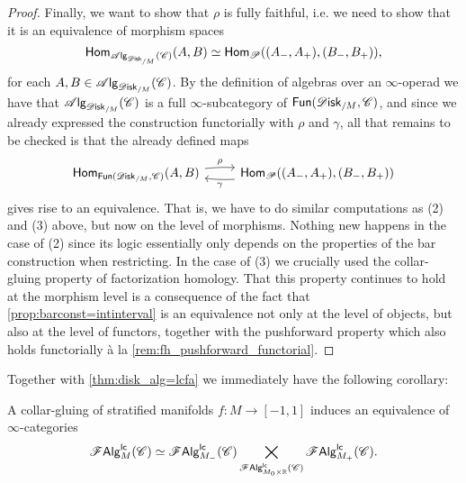 \documentclass[../text]{subfiles}
\begin{document}
\begin{proof}
    Finally, we want to show that $\rho$ is fully faithful, i.e. we need to show that it is an equivalence of morphism spaces
    \begin{equation}
        \mathsf{Hom}_{\alg{\disk_{/M}} (\catC)}(A, B) \simeq \mathsf{Hom}_{\mathscr{P}}((A_-, A_+), (B_-, B_+)),
    \end{equation}
    for each $A, B \in \alg{\disk_{/M}} (\catC)$. By the definition of algebras over an $\infty$-operad we have that $\alg{\disk_{/M}} (\catC)$ is a full $\infty$-subcategory of $\mathsf{Fun}(\disk_{/M}, \catC)$, and since we already expressed the construction functorially with $\rho$ and $\gamma$, all that remains to be checked is that the already defined maps
    \begin{equation}
        \begin{tikzcd}
            \mathsf{Hom}_{\mathsf{Fun}(\disk_{/M}, \catC)}(A, B) \arrow[r, bend left=4, "\rho"] & \mathsf{Hom}_{\mathscr{P}}((A_-, A_+), (B_-, B_+)) \arrow[l, bend left=4, "\gamma"]
        \end{tikzcd}
    \end{equation}
    gives rise to an equivalence. That is, we have to do similar computations as (2) and (3) above, but now on the level of morphisms. Nothing new happens in the case of (2) since its logic essentially only depends on the properties of the bar construction when restricting. In the case of (3) we crucially used the collar-gluing property of factorization homology. That this property continues to hold at the morphism level is a consequence of the fact that \cref{prop:barconst=intinterval} is an equivalence not only at the level of objects, but also at the level of functors, together with the pushforward property which also holds functorially à la \cref{rem:fh_pushforward_functorial}.
\end{proof}

Together with \cref{thm:disk_alg=lcfa} we immediately have the following corollary:

\begin{corollary}\label{cor:gluing_lcfas}
    A collar-gluing of stratified manifolds $f: M \rightarrow [-1,1]$ induces an equivalence of $\infty$-categories
    \begin{equation}
        \mathscr{F} \mathsf{Alg}^{\mathsf{lc}}_M (\mathscr{C}) \simeq \mathscr{F} \mathsf{Alg}^{\mathsf{lc}}_{M_-} (\mathscr{C}) \bigtimes_{\mathscr{F} \mathsf{Alg}^{\mathsf{lc}}_{M_0 \times \mathbb{R}} (\mathscr{C})} \mathscr{F} \mathsf{Alg}^{\mathsf{lc}}_{M_+}(\mathscr{C}).
    \end{equation}
\end{corollary}
\end{document}
